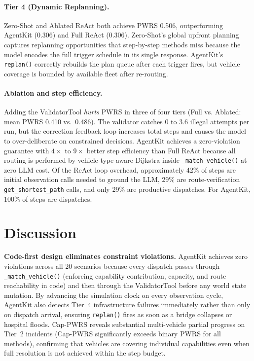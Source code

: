 \documentclass{article}
\begin{document}
\paragraph{Tier 4 (Dynamic Replanning).}
Zero-Shot and Ablated ReAct both achieve PWRS 0.506, outperforming AgentKit
(0.306) and Full ReAct (0.306). Zero-Shot's global upfront planning captures
replanning opportunities that step-by-step methods miss because the model
encodes the full trigger schedule in its single response. AgentKit's
\texttt{replan()} correctly rebuilds the plan queue after each trigger fires,
but vehicle coverage is bounded by available fleet after re-routing.

\paragraph{Ablation and step efficiency.}
Adding the ValidatorTool \emph{hurts} PWRS in three of four tiers (Full vs.
Ablated: mean PWRS 0.410 vs.\ 0.486). The validator catches 0 to 3.6 illegal
attempts per run, but the correction feedback loop increases total steps and
causes the model to over-deliberate on constrained decisions. AgentKit achieves a zero-violation guarantee with $4\times$ to $9\times$
better step efficiency than Full ReAct because all routing is performed by
vehicle-type-aware Dijkstra inside \texttt{\_match\_vehicle()} at zero LLM
cost. Of the ReAct loop overhead, approximately 42\% of steps are initial
observation calls needed to ground the LLM, 29\% are route-verification
\texttt{get\_shortest\_path} calls, and only 29\% are productive dispatches.
For AgentKit, 100\% of steps are dispatches.

\section{Discussion}
\label{sec:discussion}

\textbf{Code-first design eliminates constraint violations.}
AgentKit achieves zero violations across all 20 scenarios because every
dispatch passes through \texttt{\_match\_vehicle()} (enforcing capability
contribution, capacity, and route reachability in code) and then through the
ValidatorTool before any world state mutation. By advancing the simulation
clock on every observation cycle, AgentKit also detects Tier~4 infrastructure
failures immediately rather than only on dispatch arrival, ensuring
\texttt{replan()} fires as soon as a bridge collapses or hospital floods.
Cap-PWRS reveals substantial multi-vehicle partial progress on Tier~2
incidents (Cap-PWRS significantly exceeds binary PWRS for all methods),
confirming that vehicles are covering individual capabilities even when full
resolution is not achieved within the step budget.
\end{document}

